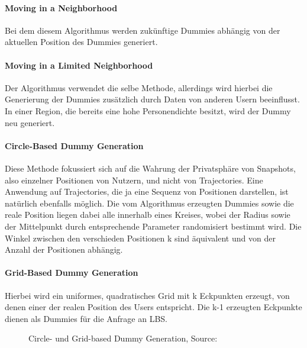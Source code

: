 	\paragraph{Moving in a Neighborhood \cite{Kido2005}} Bei dem diesem Algorithmus werden zukünftige Dummies abhängig von der aktuellen Position des Dummies generiert.
	\paragraph{Moving in a Limited Neighborhood} \cite{Kido2005} Der Algorithmus verwendet die selbe Methode, allerdings wird hierbei die Generierung der Dummies zusätzlich durch Daten von anderen Usern beeinflusst. In einer Region, die bereits eine hohe Personendichte besitzt, wird der Dummy neu generiert.
	\paragraph{Circle-Based Dummy Generation \cite{Lu2008}} Diese Methode fokussiert sich auf die Wahrung der Privatsphäre von Snapshots, also einzelner Positionen von Nutzern, und nicht von Trajectories. Eine Anwendung auf Trajectories, die ja eine Sequenz von Positionen darstellen, ist natürlich ebenfalls möglich. Die vom Algorithmus erzeugten Dummies sowie die reale Position liegen dabei alle innerhalb eines Kreises, wobei der Radius sowie der Mittelpunkt durch entsprechende Parameter randomisiert bestimmt wird. Die Winkel zwischen den verschieden Positionen k sind äquivalent und von der Anzahl der Positionen abhängig.
	\paragraph{Grid-Based Dummy Generation \cite{Lu2008}} Hierbei wird ein uniformes, quadratisches Grid mit k Eckpunkten erzeugt, von denen einer der realen Position des Users entspricht. Die k-1 erzeugten Eckpunkte dienen als Dummies für die Anfrage an LBS.
	\begin{figure}[!h]
		\centering
		\caption{Circle- und Grid-based Dummy Generation, Source: \protect\cite{Lu2008}}
		\label{fig_Lu2008}
	\end{figure}
